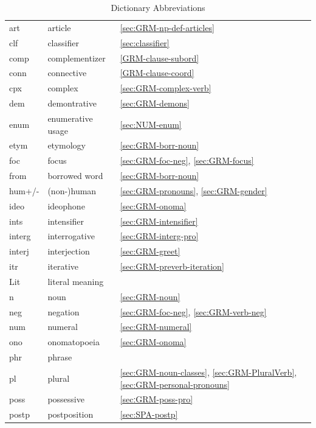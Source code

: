 \begin{table}[h] 
\footnotesize
  \centering
 \caption{Dictionary Abbreviations}
  \label{tab:dict-abb}
% 
 \begin{tabular}{lll}
art   &    article   & \ref{sec:GRM-np-def-articles}\\
clf   &    classifier   &\ref{sec:classifier}\\  
comp   &   complementizer   &\ref{GRM-clause-subord}\\  
conn   &    connective   &\ref{GRM-clause-coord}\\   
cpx    &    complex   &\ref{sec:GRM-complex-verb}\\   
dem   &   demontrative   &\ref{sec:GRM-demons}\\
enum   &    enumerative usage &\ref{sec:NUM-enum}\\
etym   &    etymology &\ref{sec:GRM-borr-noun}\\
foc    &    focus   &\ref{sec:GRM-foc-neg}, \ref{sec:GRM-focus}\\    
  from    &    borrowed word &\ref{sec:GRM-borr-noun}\\
hum+/-   &   (non-)human   & \ref{sec:GRM-pronouns}, \ref{sec:GRM-gender}\\
ideo    &    ideophone   &\ref{sec:GRM-onoma}\\ 
ints    &    intensifier   &\ref{sec:GRM-intensifier}\\ 
interg   &    interrogative     &\ref{sec:GRM-interg-pro}\\
 interj    &    interjection   &\ref{sec:GRM-greet}\\  
   itr    &    iterative   & \ref{sec:GRM-preverb-iteration}\\
    Lit    &    literal meaning & \\
  n    &    noun   & \ref{sec:GRM-noun}\\
neg    &    negation   & \ref{sec:GRM-foc-neg}, \ref{sec:GRM-verb-neg}\\  
num   &   numeral  &  \ref{sec:GRM-numeral}\\
ono   &   onomatopoeia   & \ref{sec:GRM-onoma}\\
phr   &    phrase   &    \\
pl    &   plural   & \ref{sec:GRM-noun-classes}, \ref{sec:GRM-PluralVerb}, 
\ref{sec:GRM-personal-pronouns}\\
poss    &    possessive   &\ref{secːGRM-poss-pro}\\
postp   &   postposition  &\ref{sec:SPA-postp}\\

\end{tabular}
\end{table}

